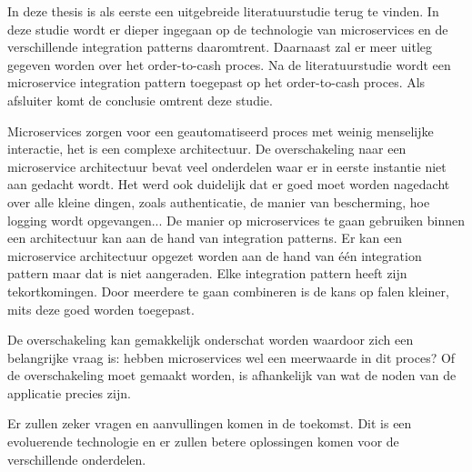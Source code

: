In deze thesis is als eerste een uitgebreide literatuurstudie terug te vinden. In deze studie wordt er dieper ingegaan op de technologie van microservices en de verschillende integration patterns daaromtrent. Daarnaast zal er meer uitleg gegeven worden over het order-to-cash proces.
Na de literatuurstudie wordt een microservice integration pattern toegepast op het order-to-cash proces. Als afsluiter komt de conclusie omtrent deze studie.

Microservices zorgen voor een geautomatiseerd proces met weinig menselijke interactie, het is een complexe architectuur. De overschakeling naar een microservice architectuur bevat veel onderdelen waar er in eerste instantie niet aan gedacht wordt. Het werd ook duidelijk dat er goed moet worden nagedacht over alle kleine dingen, zoals authenticatie, de manier van bescherming, hoe logging wordt opgevangen...
De manier op microservices te gaan gebruiken binnen een architectuur kan aan de hand van integration patterns. Er kan een microservice architectuur opgezet worden aan de hand van één integration pattern maar dat is niet aangeraden. Elke integration pattern heeft zijn tekortkomingen. Door meerdere te gaan combineren is de kans op falen kleiner, mits deze goed worden toegepast.

De overschakeling kan gemakkelijk onderschat worden waardoor zich een belangrijke vraag is: hebben microservices wel een meerwaarde in dit proces? Of de overschakeling moet gemaakt worden, is afhankelijk van wat de noden van de applicatie precies zijn.

Er zullen zeker vragen en aanvullingen komen in de toekomst. Dit is een evoluerende technologie en er zullen betere oplossingen komen voor de verschillende onderdelen.
